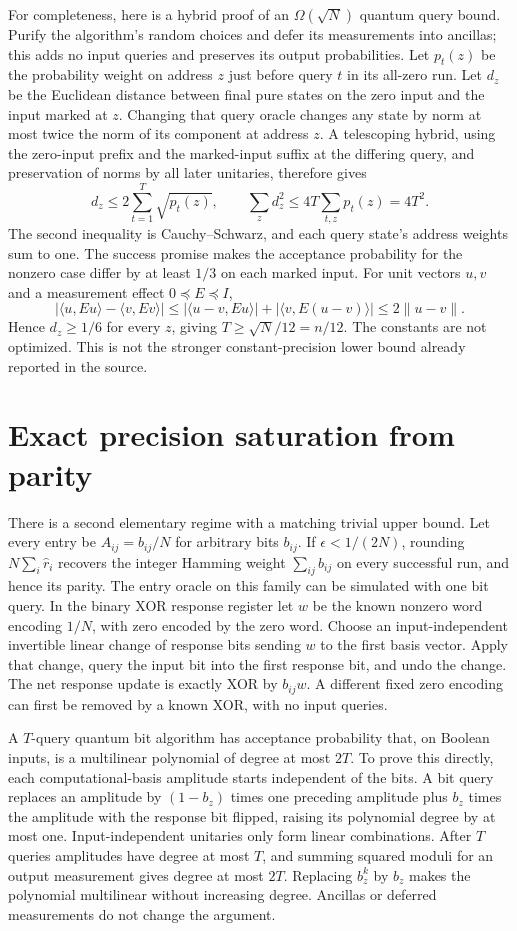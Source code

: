 \documentclass[11pt]{article}
\begin{document}
For completeness, here is a hybrid proof of an $\Omega(\sqrt N)$
quantum query bound. Purify the algorithm's random choices and
defer its measurements into ancillas; this adds no input queries
and preserves its output probabilities. Let $p_t(z)$ be the
probability weight on address $z$ just before query $t$ in its
all-zero run. Let $d_z$ be the Euclidean distance between final
pure states on the zero input and the input marked at $z$.
Changing that query oracle changes any state by norm at most
twice the norm of its component at address $z$. A telescoping
hybrid, using the zero-input prefix and the marked-input suffix
at the differing query, and preservation of norms by all later
unitaries, therefore gives
\[
 d_z\le2\sum_{t=1}^T\sqrt{p_t(z)},\qquad
 \sum_z d_z^2\le4T\sum_{t,z}p_t(z)=4T^2.
\]
The second inequality is Cauchy--Schwarz, and each query state's
address weights sum to one. The success promise makes the
acceptance probability for the nonzero case differ by at least
$1/3$ on each marked input. For unit vectors $u,v$ and a
measurement effect $0\preceq E\preceq I$,
\[
 |\langle u,Eu\rangle-\langle v,Ev\rangle|
 \le|\langle u-v,Eu\rangle|+|\langle v,E(u-v)\rangle|
 \le2\|u-v\|.
\]
Hence $d_z\ge1/6$ for every $z$, giving
$T\ge\sqrt N/12=n/12$. The constants are not optimized.
This is not the stronger constant-precision lower bound already
reported in the source.

\section{Exact precision saturation from parity}
There is a second elementary regime with a matching trivial
upper bound. Let every entry be $A_{ij}=b_{ij}/N$ for arbitrary
bits $b_{ij}$. If $\epsilon<1/(2N)$, rounding
$N\sum_i\widehat r_i$ recovers the integer Hamming weight
$\sum_{ij}b_{ij}$ on every successful run, and hence its parity.
The entry oracle on this family can be simulated with one bit
query. In the binary XOR response register let $w$ be the known
nonzero word encoding $1/N$, with zero encoded by the zero word.
Choose an input-independent invertible linear change of response
bits sending $w$ to the first basis vector. Apply that change,
query the input bit into the first response bit, and undo the
change. The net response update is exactly XOR by $b_{ij}w$.
A different fixed zero encoding can first be removed by a known
XOR, with no input queries.

A $T$-query quantum bit algorithm has acceptance probability
that, on Boolean inputs, is a multilinear polynomial of degree
at most $2T$. To prove this directly, each computational-basis
amplitude starts independent of the bits. A bit query replaces
an amplitude by $(1-b_z)$ times one preceding amplitude plus
$b_z$ times the amplitude with the response bit flipped, raising
its polynomial degree by at most one. Input-independent unitaries
only form linear combinations. After $T$ queries amplitudes have
degree at most $T$, and summing squared moduli for an output
measurement gives degree at most $2T$. Replacing $b_z^k$ by
$b_z$ makes the polynomial multilinear without increasing degree.
Ancillas or deferred measurements do not change the argument.
\end{document}
